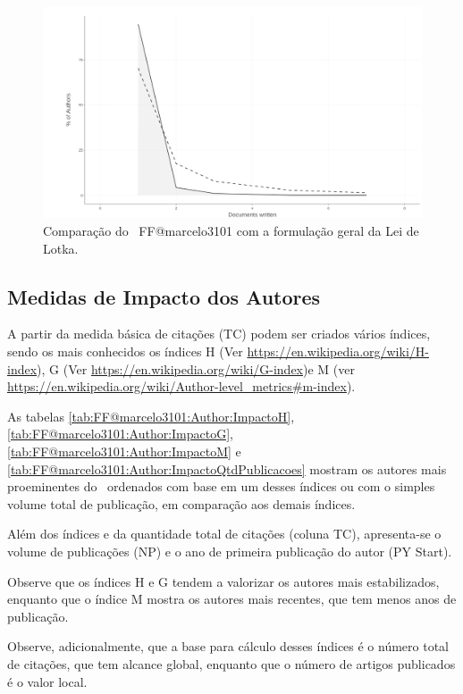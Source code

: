 \begin{figure}
    \centering
    \includegraphics[width=1\textwidth]{exploratory-data-analysis/marcelo3101/PesqBibliogr/ForestFire/WoS-20221204/assets/LoktasLawFFmarcelo3101.png}
    \caption{Comparação do \dataset\ FF@marcelo3101 com a formulação geral da Lei de Lotka.}
    \label{fig:FF@marcelo3101:Author:Lotka}
\end{figure}

\subsection{Medidas de Impacto dos Autores}

A partir da medida básica de citações (TC) podem ser criados vários índices, sendo os mais conhecidos os índices H (Ver \url{https://en.wikipedia.org/wiki/H-index}), G (Ver \url{https://en.wikipedia.org/wiki/G-index})e M (ver \url{https://en.wikipedia.org/wiki/Author-level_metrics#m-index}).

As tabelas \ref{tab:FF@marcelo3101:Author:ImpactoH}, \ref{tab:FF@marcelo3101:Author:ImpactoG}, \ref{tab:FF@marcelo3101:Author:ImpactoM} e \ref{tab:FF@marcelo3101:Author:ImpactoQtdPublicacoes} mostram os autores mais proeminentes do \dataset\ ordenados com base em um desses índices ou com o simples volume total de publicação, em comparação aos demais índices.

Além dos índices e da quantidade total de citações (coluna TC), apresenta-se o volume de publicações (NP) e o ano de primeira publicação do autor (PY Start).

Observe que os índices H e G tendem a valorizar os autores mais estabilizados, enquanto que o índice M mostra os autores mais recentes, que tem menos anos de publicação.

Observe, adicionalmente, que a base para cálculo desses índices é o número total de citações, que tem alcance global, enquanto que o número de artigos publicados é o valor local.

